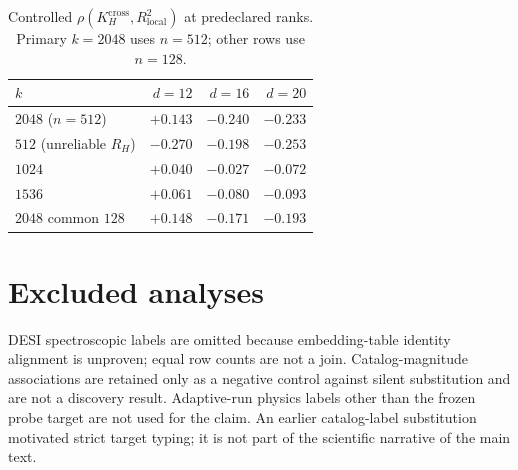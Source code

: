 \begin{table}[h]
\caption{Controlled $\rho(K_H^{\mathrm{cross}},R^{2}_{\mathrm{local}})$ at predeclared ranks. Primary $k{=}2048$ uses $n{=}512$; other rows use $n{=}128$.}
\label{tab:scale}
\centering
\footnotesize
\begin{tabular}{lrrr}
\toprule
$k$ & $d{=}12$ & $d{=}16$ & $d{=}20$ \\
\midrule
$2048$ ($n{=}512$) & $+0.143$ & $-0.240$ & $-0.233$ \\
$512$ (unreliable $R_H$) & $-0.270$ & $-0.198$ & $-0.253$ \\
$1024$ & $+0.040$ & $-0.027$ & $-0.072$ \\
$1536$ & $+0.061$ & $-0.080$ & $-0.093$ \\
$2048$ common $128$ & $+0.148$ & $-0.171$ & $-0.193$ \\
\bottomrule
\end{tabular}
\end{table}

\section{Excluded analyses}
\label{app:excluded}

DESI spectroscopic labels are omitted because embedding-table identity alignment is unproven; equal row counts are not a join. Catalog-magnitude associations are retained only as a negative control against silent substitution and are not a discovery result. Adaptive-run physics labels other than the frozen probe target are not used for the claim. An earlier catalog-label substitution motivated strict target typing; it is not part of the scientific narrative of the main text.
